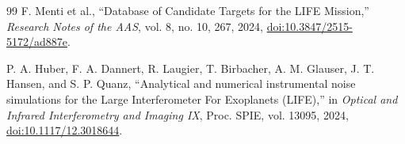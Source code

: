 \documentclass[12pt,a4paper]{article}
\numberwithin{equation}{section}
\numberwithin{figure}{section}
\numberwithin{table}{section}
\begin{document}
\begin{thebibliography}{99}
F. Menti et al.,
``Database of Candidate Targets for the LIFE Mission,''
\textit{Research Notes of the AAS}, vol. 8, no. 10, 267, 2024,
\href{https://doi.org/10.3847/2515-5172/ad887e}{doi:10.3847/2515-5172/ad887e}.

P. A. Huber, F. A. Dannert, R. Laugier, T. Birbacher, A. M. Glauser, J. T. Hansen, and S. P. Quanz,
``Analytical and numerical instrumental noise simulations for the Large Interferometer For Exoplanets (LIFE),''
in \textit{Optical and Infrared Interferometry and Imaging IX}, Proc. SPIE, vol. 13095, 2024,
\href{https://doi.org/10.1117/12.3018644}{doi:10.1117/12.3018644}.

\end{thebibliography}
\end{document}
